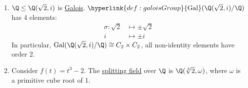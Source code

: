 \documentclass{article}
\DeclareMathOperator{\Gal}{Gal}
\begin{document}
\begin{eg}\leavevmode
    \begin{enumerate}[label=(\arabic*)]
        \item $\Q \leq \Q(\sqrt{2}, i)$ is \hyperlink{def:galoisExt}{Galois}. $\hyperlink{def:galoisGroup}{\Gal}(\Q(\sqrt{2}, i)/\Q)$ has 4 elements:
            \begin{align*}
                \sigma: \sqrt{2} &\longmapsto \pm \sqrt{2} \\
                               i &\longmapsto \pm i
            \end{align*}
            In particular, $\Gal(\Q(\sqrt{2}, i)/\Q) \cong C_2 \times C_2$, all non-identity elements have order 2.
        \item Consider $f(t) = t^3 - 2$. The \hyperlink{def:splitting}{splitting field} over $\Q$ is $\Q(\sqrt[3]{2}, \omega)$, where $\omega$ is a primitive cube root of 1.


\end{enumerate}
\end{eg}
\end{document}
